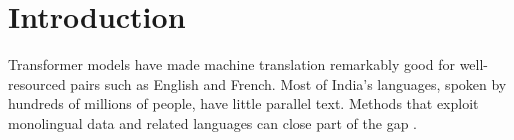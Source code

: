 \chapter{Introduction}
\label{ch:introduction}

Transformer models \citep{vaswani2017} have made machine translation remarkably good for
well-resourced pairs such as English and French. Most of India's languages, spoken by hundreds of
millions of people, have little parallel text. Methods that exploit monolingual data and related
languages can close part of the gap \citep{sennrich2016bt}.
